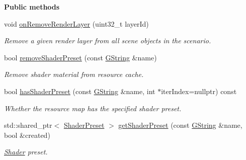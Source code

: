 \begin{Indent}\textbf{ Public methods}\par
\begin{DoxyCompactItemize}
\item 
\mbox{\label{classrev_1_1_scenario_settings_adde9fc0e663100860da295c73a8a3743}} 
void \mbox{\hyperlink{classrev_1_1_scenario_settings_adde9fc0e663100860da295c73a8a3743}{on\+Remove\+Render\+Layer}} (uint32\+\_\+t layer\+Id)
\begin{DoxyCompactList}\small\item\em Remove a given render layer from all scene objects in the scenario. \end{DoxyCompactList}\item 
\mbox{\label{classrev_1_1_scenario_settings_aae67bfa68cb12440eaa473f7a482b3b8}} 
bool \mbox{\hyperlink{classrev_1_1_scenario_settings_aae67bfa68cb12440eaa473f7a482b3b8}{remove\+Shader\+Preset}} (const \mbox{\hyperlink{classrev_1_1_g_string}{G\+String}} \&name)
\begin{DoxyCompactList}\small\item\em Remove shader material from resource cache. \end{DoxyCompactList}\item 
\mbox{\label{classrev_1_1_scenario_settings_a7b34ac614b6ab3a712678c2c9583f4af}} 
bool \mbox{\hyperlink{classrev_1_1_scenario_settings_a7b34ac614b6ab3a712678c2c9583f4af}{has\+Shader\+Preset}} (const \mbox{\hyperlink{classrev_1_1_g_string}{G\+String}} \&name, int $\ast$iter\+Index=nullptr) const
\begin{DoxyCompactList}\small\item\em Whether the resource map has the specified shader preset. \end{DoxyCompactList}\item 
\mbox{\label{classrev_1_1_scenario_settings_a4178b90ee5015105e241ce215c03d686}} 
std\+::shared\+\_\+ptr$<$ \mbox{\hyperlink{classrev_1_1_shader_preset}{Shader\+Preset}} $>$ \mbox{\hyperlink{classrev_1_1_scenario_settings_a4178b90ee5015105e241ce215c03d686}{get\+Shader\+Preset}} (const \mbox{\hyperlink{classrev_1_1_g_string}{G\+String}} \&name, bool \&created)
\begin{DoxyCompactList}\small\item\em \mbox{\hyperlink{classrev_1_1_shader}{Shader}} preset. \end{DoxyCompactList}\end{DoxyCompactItemize}
\end{Indent}
